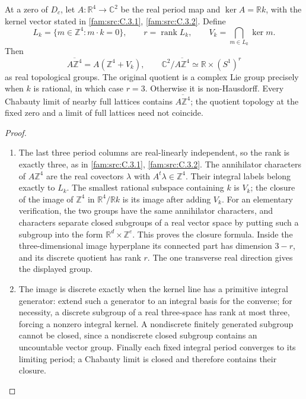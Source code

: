 \begin{proposition}\hypertarget{tag-032L}{}\label{push:src:D.4.3}

At a zero of \(D_c\), let \(A:\mathbb R^4\to\mathbb C^2\) be
the real period map and \(\ker A=\mathbb R k\), with the kernel
vector stated in \cref{fam:src:C.3.1}, \cref{fam:src:C.3.2}. Define
\[
 L_k=\{m\in\mathbb Z^4:m\cdot k=0\},\qquad r=\operatorname{rank}L_k,
 \qquad V_k=\bigcap_{m\in L_k}\ker m.
\]
Then
\[
 \overline{A\mathbb Z^4}=A(\mathbb Z^4+V_k),\qquad
 \mathbb C^2/\overline{A\mathbb Z^4}\simeq
                         \mathbb R\times(S^1)^r
\]
as real topological groups. The original quotient is a complex Lie
group precisely when \(k\) is rational, in which case \(r=3\).
Otherwise it is non-Hausdorff. Every Chabauty limit of nearby full
lattices contains \(\overline{A\mathbb Z^4}\); the quotient topology
at the fixed zero and a limit of full lattices need not coincide.
\end{proposition}


\begin{proof}
\begin{enumerate}[label=\arabic*.,leftmargin=*]
\item The last three period columns are real-linearly independent, so the
rank is exactly three, as in \cref{fam:src:C.3.1}, \cref{fam:src:C.3.2}. The annihilator characters of
\(A\mathbb Z^4\) are the real covectors \(\lambda\) with
\(A^t\lambda\in\mathbb Z^4\). Their integral labels belong exactly
to \(L_k\). The smallest rational subspace containing \(k\) is
\(V_k\); the closure of the image of \(\mathbb Z^4\) in
\(\mathbb R^4/\mathbb R k\) is its image after adding \(V_k\).
For an elementary verification, the two groups have the same
annihilator characters, and characters separate closed subgroups of
a real vector space by putting such a subgroup into the form
\(\mathbb R^d\times\mathbb Z^e\). This proves the closure formula.
Inside the three-dimensional image hyperplane its connected part
has dimension \(3-r\), and its discrete quotient has rank \(r\).
The one transverse real direction gives the displayed group.

\item The image is discrete exactly when the kernel line has a primitive
integral generator: extend such a generator to an integral basis for
the converse; for necessity, a discrete subgroup of a real
three-space has rank at most three, forcing a nonzero integral
kernel. A nondiscrete finitely generated subgroup cannot be closed,
since a nondiscrete closed subgroup contains an uncountable vector
group. Finally each fixed integral period converges to its limiting
period; a Chabauty limit is closed and therefore contains their
closure.
\end{enumerate}
\end{proof}